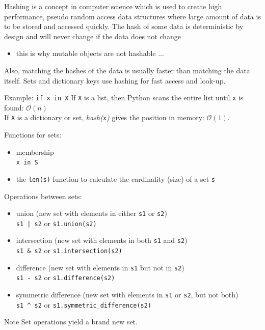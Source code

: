 \documentclass[t,handout,9pt]{beamer}
\begin{document}
\begin{frame}
\vfill
Hashing is a concept in computer science which is used to create high performance, pseudo random access data structures where large amount of data is to be stored and accessed quickly.
\vfill
The hash of some data is deterministic by design and will never change if the data does not change
\begin{itemize}
	\item this is why mutable objects are not hashable ...
\end{itemize}
\vfill
Also, matching the hashes of the data is usually faster than matching the data itself.
\vfill
Sets and dictionary keys use hashing for fast access and look-up.
\begin{block}{Example: \texttt{if x in X}}
If \texttt{X} is a list, then Python scans the entire list until \texttt{x} is found: $\mathcal{O}(n)$\\
If \texttt{X} is a dictionary or set, \textit{hash(}\texttt{x}\textit{)} gives the position in memory: $\mathcal{O}(1)$.
\end{block}
\vfill
\end{frame}
%
\begin{frame}
	\vfill
Functions for sets:
\begin{itemize}
	\item membership\\
	\quad\texttt{x in S}
	\item the \texttt{len(s)} function to calculate the cardinality (size) of a set \texttt{s}
\end{itemize}
Operations between sets:
\begin{itemize}
	\item union (new set with elements in either \texttt{s1} or \texttt{s2})\\
	\quad\texttt{s1 | s2} \qquad or \qquad \texttt{s1.union(s2)}
	\item intersection (new set with elements in both \texttt{s1} and \texttt{s2})\\
	\quad\texttt{s1 \& s2} \qquad or \qquad \texttt{s1.intersection(s2)}
	\item difference (new set with elements in \texttt{s1} but not in \texttt{s2})\\
	\quad\texttt{s1 - s2} \qquad or \qquad \texttt{s1.difference(s2)}
	\item symmetric difference (new set with elements in \texttt{s1} or \texttt{s2}, but not both)\\
	\quad\texttt{s1 \^{} s2} \qquad or \qquad \texttt{s1.symmetric\_difference(s2)}
\end{itemize}
\vfill
\begin{block}{Note}
Set operations yield a brand new set.
\end{block}
\vfill
\end{frame}
\end{document}
